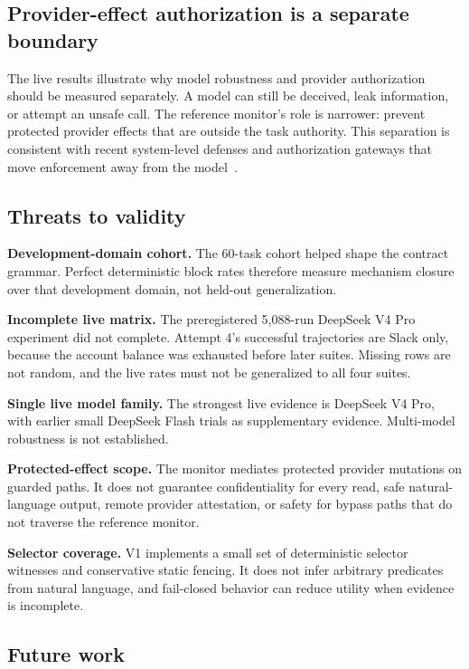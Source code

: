 \documentclass[5p,times,twocolumn]{elsarticle}
\begin{document}
\subsection{Provider-effect authorization is a separate boundary}

The live results illustrate why model robustness and provider authorization should be measured separately. A model can still be deceived, leak information, or attempt an unsafe call. The reference monitor's role is narrower: prevent protected provider effects that are outside the task authority. This separation is consistent with recent system-level defenses and authorization gateways that move enforcement away from the model~\cite{debenedetti2025camel,shi2025progent,kodathala2026aiauthz,muruaga2026bounded}.

\subsection{Threats to validity}

\textbf{Development-domain cohort.} The 60-task cohort helped shape the contract grammar. Perfect deterministic block rates therefore measure mechanism closure over that development domain, not held-out generalization.

\textbf{Incomplete live matrix.} The preregistered 5,088-run DeepSeek V4 Pro experiment did not complete. Attempt 4's successful trajectories are Slack only, because the account balance was exhausted before later suites. Missing rows are not random, and the live rates must not be generalized to all four suites.

\textbf{Single live model family.} The strongest live evidence is DeepSeek V4 Pro, with earlier small DeepSeek Flash trials as supplementary evidence. Multi-model robustness is not established.

\textbf{Protected-effect scope.} The monitor mediates protected provider mutations on guarded paths. It does not guarantee confidentiality for every read, safe natural-language output, remote provider attestation, or safety for bypass paths that do not traverse the reference monitor.

\textbf{Selector coverage.} V1 implements a small set of deterministic selector witnesses and conservative static fencing. It does not infer arbitrary predicates from natural language, and fail-closed behavior can reduce utility when evidence is incomplete.

\subsection{Future work}
\end{document}
